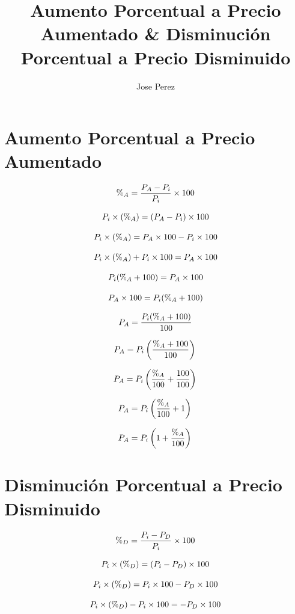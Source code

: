 \documentclass[10pt]{article}         %
\title{Aumento Porcentual a Precio Aumentado \& Disminuci\'on Porcentual a Precio Disminuido}
\author{Jose Perez}
\begin{document}
\maketitle

\section{Aumento Porcentual a Precio Aumentado}
$$
\%_A=\frac{P_A-P_i}{P_i}\times 100 \\
$$

$$
P_i\times(\%_A)=(P_A-P_i)\times 100 \\
$$

$$
P_i\times(\%_A)=P_A\times 100-P_i\times 100 \\
$$

$$
P_i\times(\%_A)+P_i\times 100=P_A\times 100 \\
$$

$$
P_i(\%_A+100)=P_A\times 100 \\
$$

$$
P_A\times 100=P_i(\%_A+100) \\
$$

$$
P_A=\frac{P_i(\%_A+100)}{100} \\
$$

$$
P_A=P_i\left (\frac{\%_A+100}{100}  \right ) \\
$$

$$
P_A=P_i\left (\frac{\%_A}{100}+\frac{100}{100}  \right ) \\
$$

$$
P_A=P_i\left (\frac{\%_A}{100}+1  \right ) \\
$$

$$
P_A=P_i\left (1+\frac{\%_A}{100}  \right ) \\
$$

\newpage

\section{Disminuci\'on Porcentual a Precio Disminuido}
$$
\%_D=\frac{P_i-P_D}{P_i}\times 100 \\
$$

$$
P_i\times(\%_D)=(P_i-P_D)\times 100 \\
$$

$$
P_i\times(\%_D)=P_i\times 100-P_D\times 100 \\
$$

$$
P_i\times(\%_D)-P_i\times 100=-P_D\times 100 \\
$$
\end{document}
